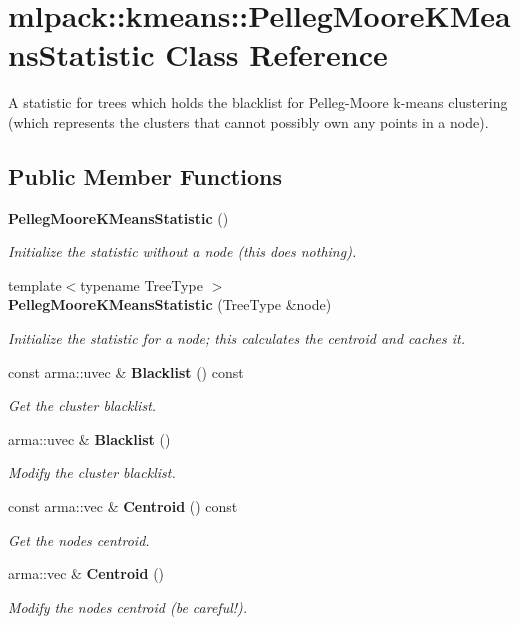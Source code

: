 \section{mlpack\+:\+:kmeans\+:\+:Pelleg\+Moore\+K\+Means\+Statistic Class Reference}
\label{classmlpack_1_1kmeans_1_1PellegMooreKMeansStatistic}


A statistic for trees which holds the blacklist for Pelleg-\/\+Moore k-\/means clustering (which represents the clusters that cannot possibly own any points in a node).  


\subsection*{Public Member Functions}
\begin{DoxyCompactItemize}
\item 
{\bf Pelleg\+Moore\+K\+Means\+Statistic} ()
\begin{DoxyCompactList}\small\item\em Initialize the statistic without a node (this does nothing). \end{DoxyCompactList}\item 
{\footnotesize template$<$typename Tree\+Type $>$ }\\{\bf Pelleg\+Moore\+K\+Means\+Statistic} (Tree\+Type \&node)
\begin{DoxyCompactList}\small\item\em Initialize the statistic for a node; this calculates the centroid and caches it. \end{DoxyCompactList}\item 
const arma\+::uvec \& {\bf Blacklist} () const 
\begin{DoxyCompactList}\small\item\em Get the cluster blacklist. \end{DoxyCompactList}\item 
arma\+::uvec \& {\bf Blacklist} ()
\begin{DoxyCompactList}\small\item\em Modify the cluster blacklist. \end{DoxyCompactList}\item 
const arma\+::vec \& {\bf Centroid} () const 
\begin{DoxyCompactList}\small\item\em Get the node\textquotesingle{}s centroid. \end{DoxyCompactList}\item 
arma\+::vec \& {\bf Centroid} ()
\begin{DoxyCompactList}\small\item\em Modify the node\textquotesingle{}s centroid (be careful!). \end{DoxyCompactList}\end{DoxyCompactItemize}

